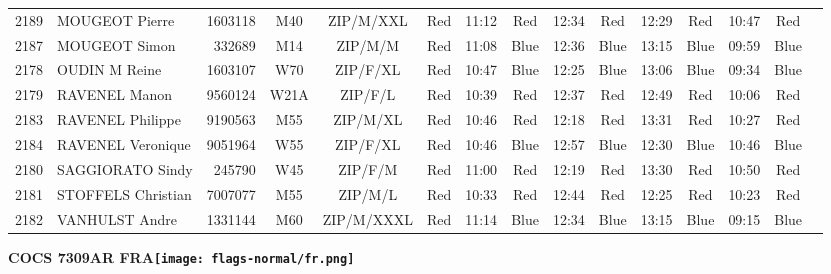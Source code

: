 \documentclass{report}
\begin{document}
\begin{longtable}{|c|l|r|c|c|*{5}{cc|}}
    2189 & MOUGEOT Pierre & 1603118 & M40 & ZIP/M/XXL & Red & 11:12 & Red & 12:34 & Red & 12:29 & Red & 10:47 & Red &  \\
    2187 & MOUGEOT Simon & 332689 & M14 & ZIP/M/M & Red & 11:08 & Blue & 12:36 & Blue & 13:15 & Blue & 09:59 & Blue &  \\
    2178 & OUDIN M Reine & 1603107 & W70 & ZIP/F/XL & Red & 10:47 & Blue & 12:25 & Blue & 13:06 & Blue & 09:34 & Blue &  \\
    2179 & RAVENEL Manon & 9560124 & W21A & ZIP/F/L & Red & 10:39 & Red & 12:37 & Red & 12:49 & Red & 10:06 & Red &  \\
    2183 & RAVENEL Philippe & 9190563 & M55 & ZIP/M/XL & Red & 10:46 & Red & 12:18 & Red & 13:31 & Red & 10:27 & Red &  \\
    2184 & RAVENEL Veronique & 9051964 & W55 & ZIP/F/XL & Red & 10:46 & Blue & 12:57 & Blue & 12:30 & Blue & 10:46 & Blue &  \\
    2180 & SAGGIORATO Sindy & 245790 & W45 & ZIP/F/M & Red & 11:00 & Red & 12:19 & Red & 13:30 & Red & 10:50 & Red &  \\
    2181 & STOFFELS Christian & 7007077 & M55 & ZIP/M/L & Red & 10:33 & Red & 12:44 & Red & 12:25 & Red & 10:23 & Red &  \\
    2182 & VANHULST Andre & 1331144 & M60 & ZIP/M/XXXL & Red & 11:14 & Blue & 12:34 & Blue & 13:15 & Blue & 09:15 & Blue &  \\
  \end{longtable}
\newpage
  \Huge \centering \bfseries COCS 7309AR FRA\normalfont \footnotesize \sffamily \hfill \texttt{[image: flags-normal/fr.png]} \newline 
\end{document}
